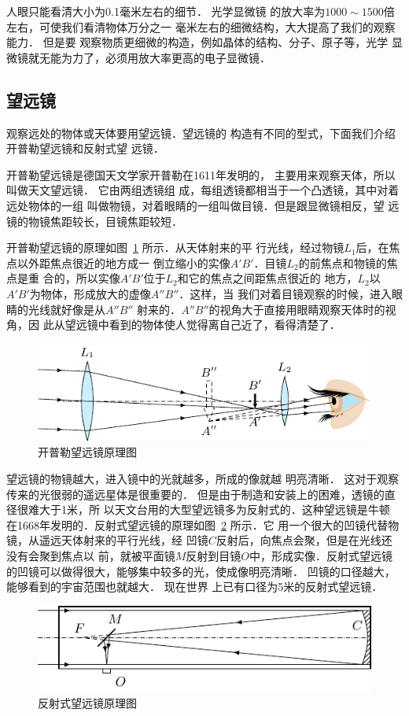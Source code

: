 人眼只能看清大小为0.1毫米左右的细节．
光学显微镜
的放大率为$1000 \sim 1500$倍左右，可使我们看清物体万分之一
毫米左右的细微结构，大大提高了我们的观察能力．
但是要
观察物质更细微的构造，例如晶体的结构、分子、原子等，光学
显微镜就无能为力了，必须用放大率更高的电子显微镜．

\subsection{望远镜}

观察远处的物体或天体要用望远镜．望远镜的
构造有不同的型式，下面我们介绍开普勒望远镜和反射式望
远镜．

开普勒望远镜是德国天文学家开普勒在1611年发明的，
主要用来观察天体，所以叫做天文望远镜．
它由两组透镜组
成，每组透镜都相当于一个凸透镜，其中对着远处物体的一组
叫做物镜，对着眼睛的一组叫做目镜．但是跟显微镜相反，望
远镜的物镜焦距较长，目镜焦距较短．


开普勒望远镜的原理如图~\ref{fig_C_5-54} 所示．从天体射来的平
行光线，经过物镜$L_1$后，在焦点以外距焦点很近的地方成一
倒立缩小的实像$A'B'$．目镜$L_2$的前焦点和物镜的焦点是重
合的，所以实像$A'B'$位于$L_2$和它的焦点之间距焦点很近的
地方，$L_2$以$A'B'$为物体，形成放大的虚像$A''B''$．这样，当
我们对着目镜观察的时候，进入眼睛的光线就好像是从$A''B''$
射来的．$A''B''$的视角大于直接用眼睛观察天体时的视角，因
此从望远镜中看到的物体使人觉得离自己近了，看得清楚了．
\begin{figure}[htbp]
	\centering
	\includegraphics{fig/C/5-54.pdf}
	\caption{开普勒望远镜原理图}\label{fig_C_5-54}
\end{figure}


望远镜的物镜越大，进入镜中的光就越多，所成的像就越
明亮清晰．
这对于观察传来的光很弱的遥远星体是很重要的．
但是由于制造和安装上的困难，透镜的直径很难大于1米，所
以天文台用的大型望远镜多为反射式的．这种望远镜是牛顿
在1668年发明的．反射式望远镜的原理如图~\ref{fig_C_5-55} 所示．它
用一个很大的凹镜代替物镜，从遥远天体射来的平行光线，经
凹镜$C$反射后，向焦点会聚，但是在光线还没有会聚到焦点以
前，就被平面镜$M$反射到目镜$O$中，形成实像．反射式望远镜
的凹镜可以做得很大，能够集中较多的光，使成像明亮清晰．
凹镜的口径越大，能够看到的宇宙范围也就越大．
现在世界
上已有口径为5米的反射式望远镜．
\begin{figure}[htbp]
    \centering
    \includegraphics{fig/C/5-55.pdf}
    \caption{反射式望远镜原理图}\label{fig_C_5-55}
\end{figure}

